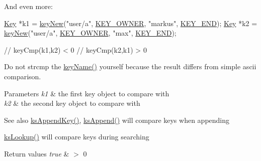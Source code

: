 And even more\+: 
\begin{DoxyCode}
\hyperlink{classkdb_1_1Key_a5679f5cae63caddd64a60388b9cc77fa}{Key} *k1 = \hyperlink{group__key_gad23c65b44bf48d773759e1f9a4d43b89}{keyNew}(\textcolor{stringliteral}{"user/a"}, \hyperlink{group__key_gga91fb3178848bd682000958089abbaf40a77ca60362fa8daca8d5347db4385068b}{KEY\_OWNER}, \textcolor{stringliteral}{"markus"}, \hyperlink{group__key_gga91fb3178848bd682000958089abbaf40aa8adb6fcb92dec58fb19410eacfdd403}{KEY\_END});
\hyperlink{classkdb_1_1Key_a5679f5cae63caddd64a60388b9cc77fa}{Key} *k2 = \hyperlink{group__key_gad23c65b44bf48d773759e1f9a4d43b89}{keyNew}(\textcolor{stringliteral}{"user/a"}, \hyperlink{group__key_gga91fb3178848bd682000958089abbaf40a77ca60362fa8daca8d5347db4385068b}{KEY\_OWNER}, \textcolor{stringliteral}{"max"}, \hyperlink{group__key_gga91fb3178848bd682000958089abbaf40aa8adb6fcb92dec58fb19410eacfdd403}{KEY\_END});

\textcolor{comment}{// keyCmp(k1,k2) < 0}
\textcolor{comment}{// keyCmp(k2,k1) > 0}
\end{DoxyCode}


Do not strcmp the \hyperlink{group__keyname_ga8e805c726a60da921d3736cda7813513}{key\+Name()} yourself because the result differs from simple ascii comparison.


\begin{DoxyParams}{Parameters}
{\em k1} & the first key object to compare with \\
\hline
{\em k2} & the second key object to compare with\\
\hline
\end{DoxyParams}
\begin{DoxySeeAlso}{See also}
\hyperlink{group__keyset_gaa5a1d467a4d71041edce68ea7748ce45}{ks\+Append\+Key()}, \hyperlink{group__keyset_ga21eb9c3a14a604ee3a8bdc779232e7b7}{ks\+Append()} will compare keys when appending 

\hyperlink{group__keyset_gaa34fc43a081e6b01e4120daa6c112004}{ks\+Lookup()} will compare keys during searching
\end{DoxySeeAlso}

\begin{DoxyRetVals}{Return values}
{\em true} & $>$ 0 \\
\hline
\end{DoxyRetVals}
\mbox{\label{classkdb_1_1Key_a4e711165a33a127d95f7102307e94bf6}} 

